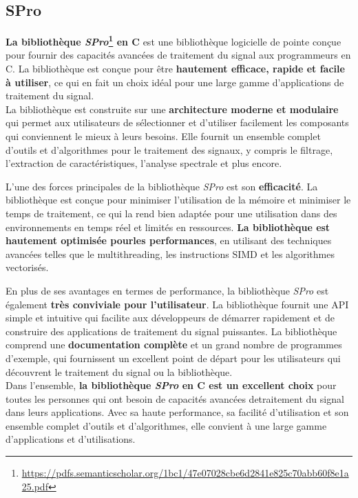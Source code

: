 \subsection{SPro}
\label{subsec:SPro}

\textbf{La bibliothèque \textit{SPro}\footnote{\url{https://pdfs.semanticscholar.org/1bc1/47e07028cbe6d2841e825c70abb60f8e1a25.pdf}} en C} est une bibliothèque logicielle de pointe conçue pour fournir des capacités avancées de traitement du signal
aux programmeurs en C. La bibliothèque est conçue pour être\textbf{ hautement efficace, rapide et facile à utiliser}, ce qui en fait un choix idéal
pour une large gamme d'applications de traitement du signal.\\

La bibliothèque est construite sur une \textbf{architecture moderne et modulaire} qui permet aux utilisateurs de sélectionner et d'utiliser facilement
les composants qui conviennent le mieux à leurs besoins. Elle fournit un ensemble complet d'outils et d'algorithmes pour le traitement des signaux,
y compris le filtrage, l'extraction de caractéristiques, l'analyse spectrale et plus encore.

L'une des forces principales de la bibliothèque \textit{SPro} est son \textbf{efficacité}. La bibliothèque est conçue pour minimiser l'utilisation de la
mémoire et minimiser le temps de traitement, ce qui la rend bien adaptée pour une utilisation dans des environnements en temps réel et limités en ressources.
\textbf{La bibliothèque est hautement optimisée pourles performances}, en utilisant des techniques avancées telles que le multithreading, les instructions SIMD
et les algorithmes vectorisés.

En plus de ses avantages en termes de performance, la bibliothèque \textit{SPro} est également \textbf{très conviviale pour l'utilisateur}. La bibliothèque
fournit une API simple et intuitive qui facilite aux développeurs de démarrer rapidement et de construire des applications de traitement du signal puissantes.
La bibliothèque comprend une \textbf{documentation complète} et un grand nombre de programmes d'exemple, qui fournissent un excellent point de départ pour les
utilisateurs qui découvrent le traitement du signal ou la bibliothèque.\\

Dans l'ensemble, \textbf{la bibliothèque \textit{SPro} en C est un excellent choix} pour toutes les personnes qui ont besoin de capacités avancées detraitement
du signal dans leurs applications. Avec sa haute performance, sa facilité d'utilisation et son ensemble complet d'outils et d'algorithmes, elle convient à une
large gamme d'applications et d'utilisations.

